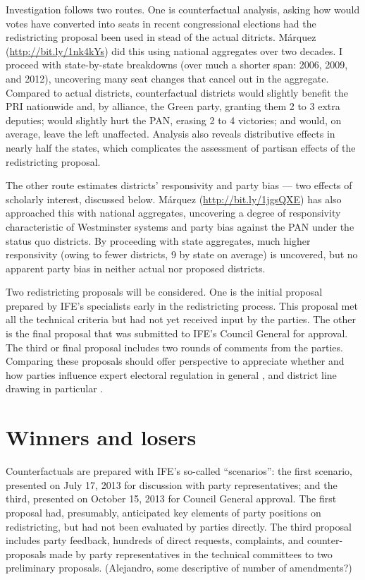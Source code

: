 \documentclass[letter,12pt]{article}
\begin{document}
Investigation follows two routes. One is counterfactual analysis, asking how would votes have converted into seats in recent congressional elections had the redistricting proposal been used in stead of the actual ditricts. M\'arquez (\href{http://bit.ly/1nk4kYs}{\url{http://bit.ly/1nk4kYs}}) did this using national aggregates over two decades. I proceed with state-by-state breakdowns (over much a shorter span: 2006, 2009, and 2012), uncovering many seat changes that cancel out in the aggregate. Compared to actual districts, counterfactual districts would slightly benefit the PRI nationwide and, by alliance, the Green party, granting them 2 to 3 extra deputies; would slightly hurt the PAN, erasing 2 to 4 victories; and would, on average, leave the left unaffected. Analysis also reveals distributive effects in nearly half the states, which complicates the assessment of partisan effects of the redistricting proposal.

The other route estimates districts' responsivity and party bias --- two effects of scholarly interest, discussed below. M\'arquez (\href{http://bit.ly/1jgsQXE}{\url{http://bit.ly/1jgsQXE}}) has also approached this with national aggregates, uncovering a degree of responsivity characteristic of Westminster systems and party bias against the PAN under the status quo districts. By proceeding with state aggregates, much higher responsivity (owing to fewer districts, 9 by state on average) is uncovered, but no apparent party bias in neither actual nor proposed districts. 

Two redistricting proposals will be considered. One is the initial proposal prepared by IFE's specialists early in the redistricting process. This proposal met all the technical criteria but had not yet received input by the parties. The other is the final proposal that was submitted to IFE's Council General for approval. The third or final proposal includes two rounds of comments from the parties. Comparing these proposals should offer perspective to appreciate whether and how parties influence expert electoral regulation in general \citep{estevez.magar.rosas.2008}, and district line drawing in particular \citep{rossiter.etal.1997,cox.katz.2002}. 

\section{Winners and losers}

Counterfactuals are prepared with IFE's so-called ``scenarios'': the first scenario, presented on July 17, 2013 for discussion with party representatives; and the third, presented on October 15, 2013 for Council General approval. The first proposal had, presumably, anticipated key elements of party positions on redistricting, but had not been evaluated by parties directly. The third proposal includes party feedback, hundreds of direct requests, complaints, and counter-proposals made by party representatives in the technical committees to two preliminary proposals. (Alejandro, some descriptive of number of amendments?) 
\end{document}
